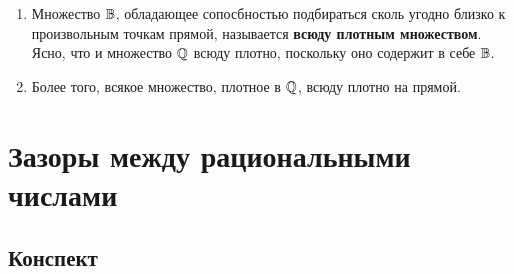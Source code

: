 \begin{enumerate}
\item Множество $\mathbb B$, обладающее сопосбностью подбираться сколь угодно близко к произвольным точкам прямой, называется \textbf{всюду плотным множеством}. Ясно, что и множество $\mathbb Q$ всюду плотно, поскольку оно содержит в себе $\mathbb B$.
\item Более того, всякое множество, плотное в $\mathbb Q$, всюду плотно на прямой.
\end{enumerate}


\section{Зазоры между рациональными числами}

\subsection*{Конспект}

